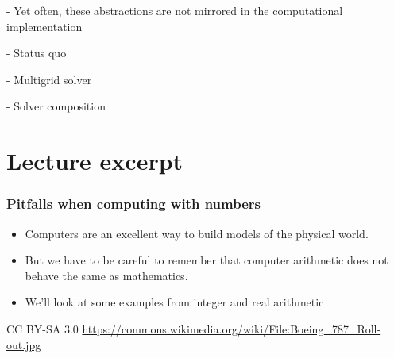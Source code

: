 \documentclass[presentation]{beamer}
\begin{document}
- Yet often, these abstractions are not mirrored in the computational
implementation

- Status quo

- Multigrid solver

- Solver composition


\section{Lecture excerpt}

\begin{frame}[fragile]
  \frametitle{Pitfalls when computing with numbers}
  \begin{itemize}
  \item Computers are an excellent way to build models of the physical
    world.
  \item But we have to be careful to remember that computer arithmetic
    does not behave the same as mathematics.
  \item We'll look at some examples from integer and real arithmetic
  \end{itemize}
\end{frame}

\begin{frame}[plain,t]
  \begin{flushright}
      \tiny CC BY-SA 3.0
      \url{https://commons.wikimedia.org/wiki/File:Boeing_787_Roll-out.jpg}
  \end{flushright}
\end{frame}
\end{document}
